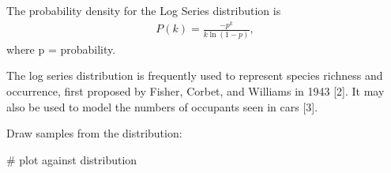 \documentclass[letterpaper,10pt,english]{sphinxmanual}
\begin{document}
\begin{fulllineitems}
The probability density for the Log Series distribution is
\begin{equation*}
\begin{split}P(k) = \frac{-p^k}{k \ln(1-p)},\end{split}
\end{equation*}
where p = probability.

The log series distribution is frequently used to represent species
richness and occurrence, first proposed by Fisher, Corbet, and
Williams in 1943 {[}2{]}.  It may also be used to model the numbers of
occupants seen in cars {[}3{]}.

Draw samples from the distribution:

\begin{sphinxVerbatim}[commandchars=\\\{\}]
  
   
   
    
\end{sphinxVerbatim}

\#   plot against distribution

\begin{sphinxVerbatim}[commandchars=\\\{\}]
  
     
  
           
\end{sphinxVerbatim}

\end{fulllineitems}
\end{document}
